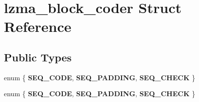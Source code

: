 \section{lzma\+\_\+block\+\_\+coder Struct Reference}
\label{structlzma__block__coder}
\subsection*{Public Types}
\begin{DoxyCompactItemize}
\item 
\mbox{\label{structlzma__block__coder_a22c984447eb22efeceeca077cf196e67}} 
enum \{ {\bfseries S\+E\+Q\+\_\+\+C\+O\+DE}, 
{\bfseries S\+E\+Q\+\_\+\+P\+A\+D\+D\+I\+NG}, 
{\bfseries S\+E\+Q\+\_\+\+C\+H\+E\+CK}
 \}
\item 
\mbox{\label{structlzma__block__coder_a9f737a59391bfa7fab7b71577fcd06e6}} 
enum \{ {\bfseries S\+E\+Q\+\_\+\+C\+O\+DE}, 
{\bfseries S\+E\+Q\+\_\+\+P\+A\+D\+D\+I\+NG}, 
{\bfseries S\+E\+Q\+\_\+\+C\+H\+E\+CK}
 \}
\end{DoxyCompactItemize}
